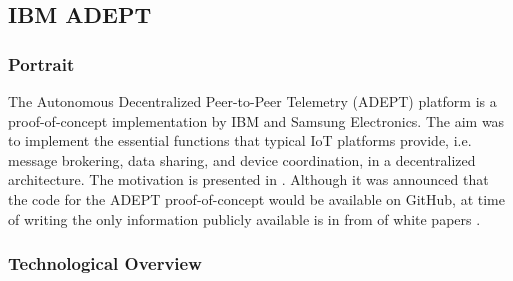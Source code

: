 





\subsection{IBM ADEPT}

\subsubsection{Portrait}
The Autonomous Decentralized Peer-to-Peer Telemetry (ADEPT) platform is a proof-of-concept implementation by IBM and Samsung Electronics. The aim was to implement the essential functions that typical IoT platforms provide, i.e. message brokering, data sharing, and device coordination, in a decentralized architecture. The motivation is presented in \cite{devicedemocracy}. 
Although it was announced that the code for the ADEPT proof-of-concept would be available on GitHub, at time of writing the only information publicly available is in from of white papers \cite{empoweringtheedge}. 

\subsubsection{Technological Overview}

